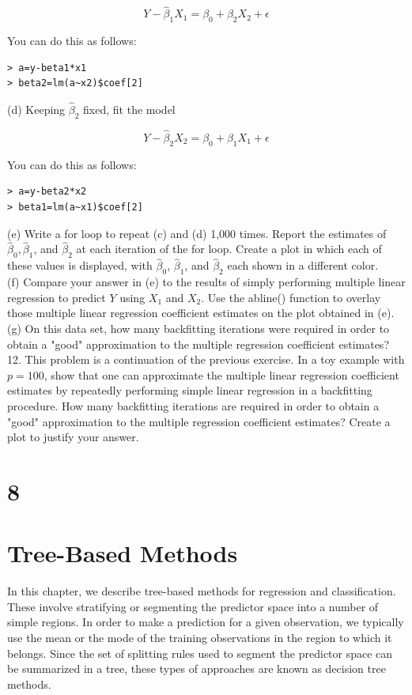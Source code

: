 \documentclass[10pt]{article}
\begin{document}
$$
Y-\hat{\beta}_{1} X_{1}=\beta_{0}+\beta_{2} X_{2}+\epsilon
$$

You can do this as follows:

\begin{verbatim}
> a=y-beta1*x1
> beta2=lm(a~x2)$coef[2]
\end{verbatim}

(d) Keeping $\hat{\beta}_{2}$ fixed, fit the model

$$
Y-\hat{\beta}_{2} X_{2}=\beta_{0}+\beta_{1} X_{1}+\epsilon
$$

You can do this as follows:

\begin{verbatim}
> a=y-beta2*x2
> beta1=lm(a~x1)$coef[2]
\end{verbatim}

(e) Write a for loop to repeat (c) and (d) 1,000 times. Report the estimates of $\hat{\beta}_{0}, \hat{\beta}_{1}$, and $\hat{\beta}_{2}$ at each iteration of the for loop. Create a plot in which each of these values is displayed, with $\hat{\beta}_{0}$, $\hat{\beta}_{1}$, and $\hat{\beta}_{2}$ each shown in a different color.\\
(f) Compare your answer in (e) to the results of simply performing multiple linear regression to predict $Y$ using $X_{1}$ and $X_{2}$. Use the abline() function to overlay those multiple linear regression coefficient estimates on the plot obtained in (e).\\
(g) On this data set, how many backfitting iterations were required in order to obtain a "good" approximation to the multiple regression coefficient estimates?\\
12. This problem is a continuation of the previous exercise. In a toy example with $p=100$, show that one can approximate the multiple linear regression coefficient estimates by repeatedly performing simple linear regression in a backfitting procedure. How many backfitting iterations are required in order to obtain a "good" approximation to the multiple regression coefficient estimates? Create a plot to justify your answer.

\section*{8}
\section*{Tree-Based Methods}
In this chapter, we describe tree-based methods for regression and classification. These involve stratifying or segmenting the predictor space into a number of simple regions. In order to make a prediction for a given observation, we typically use the mean or the mode of the training observations in the region to which it belongs. Since the set of splitting rules used to segment the predictor space can be summarized in a tree, these types of approaches are known as decision tree methods.
\end{document}
